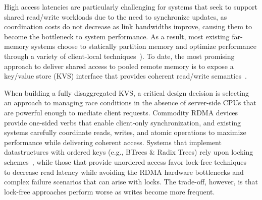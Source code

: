High access latencies are particularly challenging for systems that
seek to support shared read/write workloads due to the need to
synchronize updates, as coordination costs do not decrease as link bandwidths improve, causing them to become the bottleneck to system performance.
As a result, most existing far-memory systems choose to statically
partition memory and optimize performance through a
variety of client-local techniques~\cite{kona,mira,aifm,trackfm,carbink}).
To date, the most promising approach to deliver shared access to
pooled remote memory is to expose a key/value store (KVS) interface that
provides coherent read/write
semantics~\cite{rolex,smart,ditto,fusee,clover,sherman,ford}.

When building a fully disaggregated KVS, a critical design
decision is selecting an approach to managing race conditions in the
absence of server-side CPUs that are powerful enough to mediate client
requests.
Commodity RDMA devices provide one-sided verbs that enable client-only
synchronization, and existing systems carefully coordinate reads,
writes, and atomic operations to maximize performance while delivering
coherent access.  Systems that implement datastructures with ordered
keys (e.g., BTrees \& Radix Trees) rely upon locking
schemes~\cite{smart,sherman}, while those that provide unordered
access favor lock-free techniques~\cite{rolex,ditto,fusee,clover} to
decrease read latency while avoiding the RDMA hardware bottlenecks and complex
failure scenarios that can arise with locks.  The trade-off, however,
is that lock-free approaches perform worse as writes become more
frequent.


